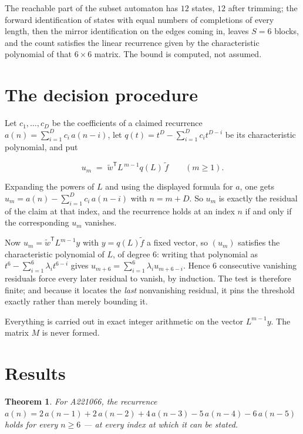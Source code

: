 \documentclass[11pt]{article}
\newtheorem{theorem}{Theorem}
\theoremstyle{definition}
\begin{document}
The reachable part of the subset automaton has $12$ states, $12$ after trimming; the forward identification of states with equal numbers of completions of every length, then the mirror identification on the edges coming in, leaves $S = 6$ blocks, and the count satisfies the linear recurrence given by the characteristic polynomial of that $6\times6$ matrix. The bound is computed, not assumed.

\section{The decision procedure}

Let $c_1,\dots,c_D$ be the coefficients of a claimed recurrence $a(n) = \sum_{i=1}^{D} c_i\,a(n-i)$, let $q(t) = t^{D} - \sum_{i=1}^{D} c_i t^{D-i}$ be its characteristic polynomial, and put

\[u_m \;=\; \tilde w^{\mathsf T} L^{\,m-1} q(L)\,\tilde f \qquad (m \ge 1).\]

Expanding the powers of $L$ and using the displayed formula for $a$, one gets $u_m = a(n) - \sum_{i=1}^{D} c_i\,a(n-i)$ with $n = m + D$. So $u_m$ is exactly the residual of the claim at that index, and the recurrence holds at an index $n$ if and only if the corresponding $u_m$ vanishes.

Now $u_m = \tilde w^{\mathsf T} L^{m-1} y$ with $y = q(L)\tilde f$ a fixed vector, so $(u_m)$ satisfies the characteristic polynomial of $L$, of degree $6$: writing that polynomial as $t^{6} - \sum_{i=1}^{6} \lambda_i t^{6-i}$ gives $u_{m+6} = \sum_{i=1}^{6} \lambda_i u_{m+6-i}$. Hence $6$ consecutive vanishing residuals force every later residual to vanish, by induction. The test is therefore finite; and because it locates the {\itshape last} nonvanishing residual, it pins the threshold exactly rather than merely bounding it.

Everything is carried out in exact integer arithmetic on the vector $L^{m-1}y$. The matrix $M$ is never formed.

\section{Results}

\begin{theorem} For A221066, the recurrence $a(n) = 2\,a(n-1) + 2\,a(n-2) + 4\,a(n-3) - 5\,a(n-4) - 6\,a(n-5)$ holds for every $n \ge 6$ --- at every index at which it can be stated.\end{theorem}
\end{document}
